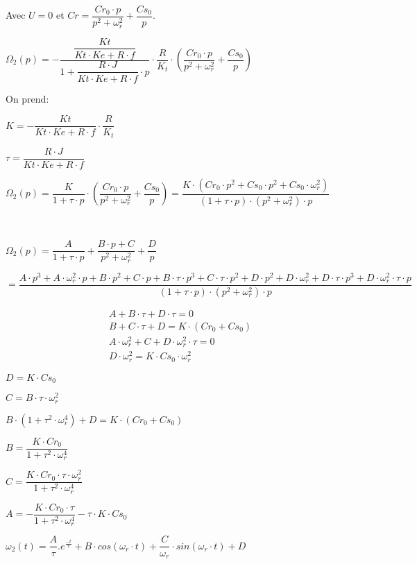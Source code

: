 {Avec $U=0$ et $Cr=\dfrac{Cr_0\cdot p}{p^2+\omega_r^2}+\dfrac{Cs_0}{p}$.


$\Omega_2(p)=-\dfrac{\dfrac{Kt}{Kt\cdot Ke+R\cdot f}}{1+\dfrac{R\cdot J}{Kt\cdot Ke+R\cdot f}\cdot p}\cdot \dfrac{R}{K_t}\cdot \left(\dfrac{Cr_0\cdot p}{p^2+\omega_r^2}+\dfrac{Cs_0}{p}\right)$

On prend:

$K=-\dfrac{Kt}{Kt\cdot Ke+R\cdot f}\cdot \dfrac{R}{K_t}$

$\tau=\dfrac{R\cdot J}{Kt\cdot Ke+R\cdot f}$

$\Omega_2(p)=\dfrac{K}{1+\tau\cdot p}\cdot \left(\dfrac{Cr_0\cdot p}{p^2+\omega_r^2}+\dfrac{Cs_0}{p}\right)=\dfrac{K\cdot(Cr_0\cdot p^2+Cs_0\cdot p^2+Cs_0\cdot \omega_r^2)}{(1+\tau\cdot p)\cdot(p^2+\omega_r^2)\cdot p}$

~\

$\Omega_2(p)=\dfrac{A}{1+\tau\cdot p}+\dfrac{B\cdot p+C}{p^2+\omega_r^2}+\dfrac{D}{p}$

$=\dfrac{A\cdot p^3+A\cdot \omega_r^2\cdot p+B\cdot p^2+C\cdot p+B\cdot \tau\cdot p^3+C\cdot \tau \cdot p^2+D\cdot p^2+D\cdot \omega_r^2+D\cdot \tau\cdot p^3+D\cdot \omega_r^2\cdot \tau\cdot p}{(1+\tau\cdot p)\cdot(p^2+\omega_r^2)\cdot p}$

\begin{eqnarray}
A+B\cdot \tau+D\cdot \tau=0 \\
B+C\cdot \tau+D=K\cdot(Cr_0+Cs_0) \\
A\cdot \omega_r^2+C+D\cdot \omega_r^2\cdot \tau=0 \\
D \cdot \omega_r^2=K\cdot Cs_0\cdot \omega_r^2
\end{eqnarray}

$D=K\cdot Cs_0$

$C=B\cdot \tau \cdot \omega_r^2$

$B\cdot (1+\tau^2 \cdot \omega_r^4)+D=K\cdot(Cr_0+Cs_0)$

$B=\dfrac{K\cdot Cr_0}{1+\tau^2 \cdot \omega_r^4}$

$C=\dfrac{K\cdot Cr_0\cdot \tau \cdot \omega_r^2}{1+\tau^2 \cdot \omega_r^4}$

$A=-\dfrac{K\cdot Cr_0\cdot \tau}{1+\tau^2 \cdot \omega_r^4}-\tau\cdot K\cdot Cs_0$


$\omega_2(t)=\dfrac{A}{\tau}.e^{\frac{-t}{\tau}}+B\cdot cos(\omega_r\cdot t)+\dfrac{C}{\omega_r}\cdot sin(\omega_r\cdot t)+D$
}